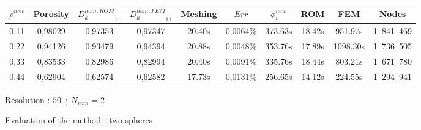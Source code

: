 {\begin{figure}[H]%
%
\begin{center}
\begin{tabular}{|c|c||c|c||c|c||c|c||c||c|}
\hline
\rowcolor{lightgray} $\rho^{new}$&Porosity&${D_k^{hom,ROM}}_{11}$&${D_k^{hom,FEM}}_{11}$&Meshing&$Err$&$\phi_i^{new}$&ROM&FEM&Nodes\\
\hline
0,11&0,98029&0,97353&0,97347&20.40s&0,0064\%&373.63s&18.42s&951.97s&1\ 841\ 469\\
\hline
0,22&0,94126&0,93479&0,94394&20.88s&0,0048\%&353.76s&17.89s&1098.30s&1\ 736\ 505\\
\hline
0,33&0,83533&0,82986&0,82994&20.40s&0,0091\%&335.76s&18.44s&803.21s&1\ 671\ 780\\
\hline
0,44&0,62904&0,62574&0,62582&17.73s&0,0131\%&256.65s&14.12s&224.55s&1\ 294\ 941\\
\hline
\end{tabular}
\end{center}
\caption{Resolution : $50$\ ; $N_{rom}=2$}
%
\end{figure}

\ligneinter
\begin{figure}[H]%
%
\begin{table}[H]
\begin{center}
%
%
\qquad
{}%
%
\end{center}
\end{table}
%
\caption{Evaluation of the method : two spheres}
\end{figure}

}
